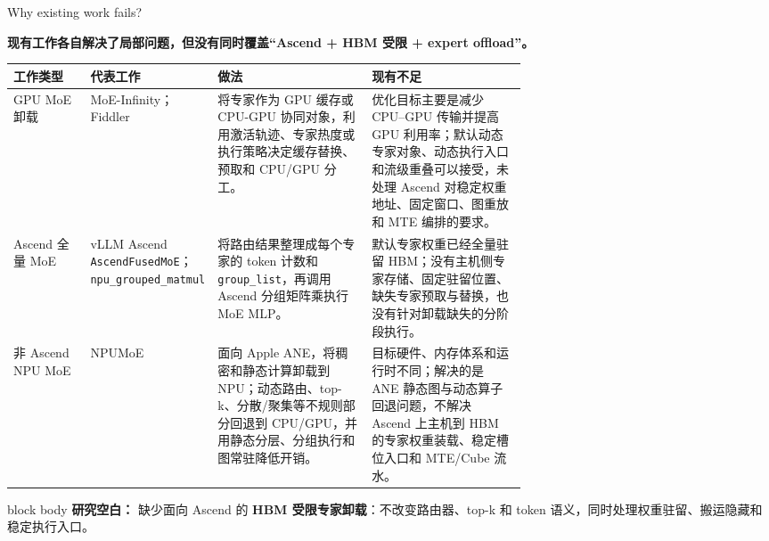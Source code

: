 \documentclass[aspectratio=169,10pt]{beamer}
\newcommand{\bluepoint}[1]{\textbf{\textcolor{MainBlue}{#1}}}
\begin{document}
\begin{frame}[t]{Why existing work fails?}
\scriptsize
\vspace{-0.55em}

\bluepoint{现有工作各自解决了局部问题，但没有同时覆盖“Ascend + HBM 受限 + expert offload”。}

\vspace{0.3em}
\setlength{\tabcolsep}{3pt}
\renewcommand{\arraystretch}{1.13}
\begin{tabularx}{\linewidth}{L{0.15\linewidth}L{0.22\linewidth}L{0.30\linewidth}Y}
\toprule
\textbf{工作类型} & \textbf{代表工作} & \textbf{做法} & \textbf{现有不足} \\
\midrule
GPU MoE 卸载 &
MoE-Infinity；Fiddler &
将专家作为 GPU 缓存或 CPU-GPU 协同对象，利用激活轨迹、专家热度或执行策略决定缓存替换、预取和 CPU/GPU 分工。 &
优化目标主要是减少 CPU--GPU 传输并提高 GPU 利用率；默认动态专家对象、动态执行入口和流级重叠可以接受，未处理 Ascend 对稳定权重地址、固定窗口、图重放和 MTE 编排的要求。 \\
\midrule
Ascend 全量 MoE &
vLLM Ascend \texttt{AscendFusedMoE}；\texttt{npu\_grouped\_matmul} &
将路由结果整理成每个专家的 token 计数和 \texttt{group\_list}，再调用 Ascend 分组矩阵乘执行 MoE MLP。 &
默认专家权重已经全量驻留 HBM；没有主机侧专家存储、固定驻留位置、缺失专家预取与替换，也没有针对卸载缺失的分阶段执行。 \\
\midrule
非 Ascend NPU MoE &
NPUMoE &
面向 Apple ANE，将稠密和静态计算卸载到 NPU；动态路由、top-k、分散/聚集等不规则部分回退到 CPU/GPU，并用静态分层、分组执行和图常驻降低开销。 &
目标硬件、内存体系和运行时不同；解决的是 ANE 静态图与动态算子回退问题，不解决 Ascend 上主机到 HBM 的专家权重装载、稳定槽位入口和 MTE/Cube 流水。 \\
\bottomrule
\end{tabularx}
\setlength{\tabcolsep}{6pt}
\renewcommand{\arraystretch}{1.0}

\vspace{0.3em}
\begin{beamercolorbox}[wd=\linewidth,sep=0.45em,rounded=true]{block body}
\textbf{\textcolor{AccentRed}{研究空白：}}
缺少面向 Ascend 的 \textbf{HBM 受限专家卸载}：不改变路由器、top-k 和 token 语义，同时处理权重驻留、搬运隐藏和稳定执行入口。
\end{beamercolorbox}
\end{frame}
\end{document}
